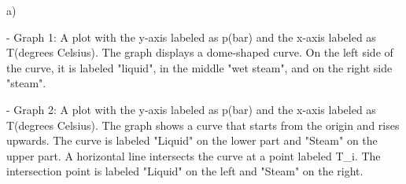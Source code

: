 a) 

- Graph 1: A plot with the y-axis labeled as p(bar) and the x-axis labeled as T(degrees Celsius). The graph displays a dome-shaped curve. On the left side of the curve, it is labeled "liquid", in the middle "wet steam", and on the right side "steam".

- Graph 2: A plot with the y-axis labeled as p(bar) and the x-axis labeled as T(degrees Celsius). The graph shows a curve that starts from the origin and rises upwards. The curve is labeled "Liquid" on the lower part and "Steam" on the upper part. A horizontal line intersects the curve at a point labeled T_i. The intersection point is labeled "Liquid" on the left and "Steam" on the right.